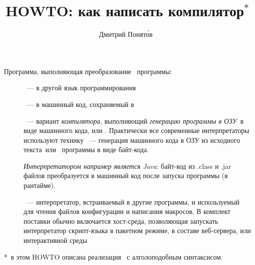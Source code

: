 
\author{Дмитрий Понят\'{о}в\ }
\title{HOWTO: как написать компилятор$^*$}

\maketitle
\tableofcontents
{}

Программа, выполняющая преобразование
\ программы:
\begin{description}
	\item[]\label{translator}\ ---
		в другой язык программирования
	\item[]\label{compiler}\ ---
		в машинный код, сохраняемый в 
	\item[]\label{interpreter}\ ---
		вариант \emph{компилятора}, выполняющий \emph{генерацию программы в
		ОЗУ}\ в виде машинного
		кода, или .
		Практически все современные интерпретаторы используют технику
		\ --- генерация машинного кода
		в ОЗУ из исходного текста\ или \ программы в виде
		байт-кода.
		
		\emph{Интерпретатором например является
		Java}:
		байт-код из .class и .jar файлов преобразуется в машинный код
		после запуска программы (в рантайме).
	\item[]\label{script}\ ---
		интерпретатор, встраиваемый в другие программы, и используемый
		для чтения файлов конфигурации и написания макросов. В комплект поставки
		обычно включается хост-среда, позволяющая запускать интерпретатор
		скрипт-языка в пакетном режиме,
		в составе веб-сервера, или интерактивной среды
\end{description}

*\ в этом HOWTO описана реализация \ с
алголоподобным синтаксисом.

\clearpage
{}
\printindex

